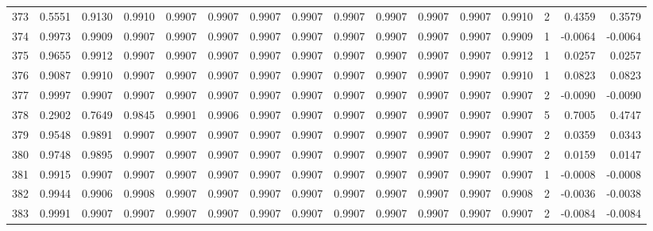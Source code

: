 \begin{tabular}{lrrrrrrrrrrrrrrr}
373 &      0.5551 &  0.9130 &  0.9910 &  0.9907 &  0.9907 &  0.9907 &  0.9907 &  0.9907 &  0.9907 &  0.9907 &   0.9907 &     0.9910 &      2 &                    0.4359 &                     0.3579 \\
374 &      0.9973 &  0.9909 &  0.9907 &  0.9907 &  0.9907 &  0.9907 &  0.9907 &  0.9907 &  0.9907 &  0.9907 &   0.9907 &     0.9909 &      1 &                   -0.0064 &                    -0.0064 \\
375 &      0.9655 &  0.9912 &  0.9907 &  0.9907 &  0.9907 &  0.9907 &  0.9907 &  0.9907 &  0.9907 &  0.9907 &   0.9907 &     0.9912 &      1 &                    0.0257 &                     0.0257 \\
376 &      0.9087 &  0.9910 &  0.9907 &  0.9907 &  0.9907 &  0.9907 &  0.9907 &  0.9907 &  0.9907 &  0.9907 &   0.9907 &     0.9910 &      1 &                    0.0823 &                     0.0823 \\
377 &      0.9997 &  0.9907 &  0.9907 &  0.9907 &  0.9907 &  0.9907 &  0.9907 &  0.9907 &  0.9907 &  0.9907 &   0.9907 &     0.9907 &      2 &                   -0.0090 &                    -0.0090 \\
378 &      0.2902 &  0.7649 &  0.9845 &  0.9901 &  0.9906 &  0.9907 &  0.9907 &  0.9907 &  0.9907 &  0.9907 &   0.9907 &     0.9907 &      5 &                    0.7005 &                     0.4747 \\
379 &      0.9548 &  0.9891 &  0.9907 &  0.9907 &  0.9907 &  0.9907 &  0.9907 &  0.9907 &  0.9907 &  0.9907 &   0.9907 &     0.9907 &      2 &                    0.0359 &                     0.0343 \\
380 &      0.9748 &  0.9895 &  0.9907 &  0.9907 &  0.9907 &  0.9907 &  0.9907 &  0.9907 &  0.9907 &  0.9907 &   0.9907 &     0.9907 &      2 &                    0.0159 &                     0.0147 \\
381 &      0.9915 &  0.9907 &  0.9907 &  0.9907 &  0.9907 &  0.9907 &  0.9907 &  0.9907 &  0.9907 &  0.9907 &   0.9907 &     0.9907 &      1 &                   -0.0008 &                    -0.0008 \\
382 &      0.9944 &  0.9906 &  0.9908 &  0.9907 &  0.9907 &  0.9907 &  0.9907 &  0.9907 &  0.9907 &  0.9907 &   0.9907 &     0.9908 &      2 &                   -0.0036 &                    -0.0038 \\
383 &      0.9991 &  0.9907 &  0.9907 &  0.9907 &  0.9907 &  0.9907 &  0.9907 &  0.9907 &  0.9907 &  0.9907 &   0.9907 &     0.9907 &      2 &                   -0.0084 &                    -0.0084 \\

\end{tabular}
